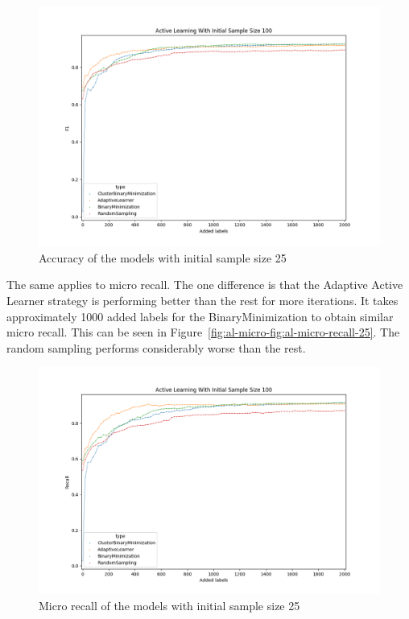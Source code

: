 \begin{figure}
    \centering
    \includegraphics[scale=0.5]{figures/al-25-micro-f1.png}
    \caption{Accuracy of the models with initial sample size 25}
    \label{fig:al-micro-f1-25}
\end{figure}

The same applies to micro recall.
The one difference is that the Adaptive Active Learner strategy is performing better than the rest for more iterations.
It takes approximately 1000 added labels for the BinaryMinimization to obtain similar micro recall.
This can be seen in Figure~\ref{fig:al-micro-fig:al-micro-recall-25}.
The random sampling performs considerably worse than the rest.

\begin{figure}
    \centering
    \includegraphics[scale=0.5]{figures/al-25-micro-recall.png}
    \caption{Micro recall of the models with initial sample size 25}
    \label{fig:al-micro-recall-25}
\end{figure}

